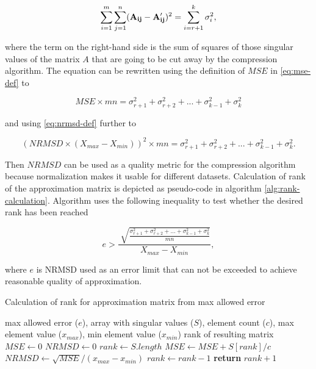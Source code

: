\begin{equation}
\sum_{i=1}^{m} \sum_{j=1}^{n} (\mathbf{A_{ij}} - \mathbf{A'_{ij}})^{2} = \sum_{i=r+1}^{k}{\sigma_{i}^{2}},
\end{equation}

where the term on the right-hand side is the sum of squares of those singular values of the matrix $A$ that are going to be cut away by the compression algorithm. The equation can be rewritten using the definition of $MSE$ in \eqref{eq:mse-def} to

\begin{equation}
MSE \times m n = \sigma_{r+1}^{2} + \sigma_{r+2}^{2} + ... + \sigma_{k-1}^{2} + \sigma_{k}^2
\end{equation}

and using \eqref{eq:nrmsd-def} further to

\begin{equation}
(NRMSD \times (X_{max}-X_{min}))^{2} \times m n = \sigma_{r+1}^{2} + \sigma_{r+2}^{2} + ... + \sigma_{k-1}^{2} + \sigma_{k}^2.
\end{equation}

Then $NRMSD$ can be used as a quality metric for the compression algorithm because normalization makes it usable for different datasets. Calculation of rank of the approximation matrix is depicted as pseudo-code in algorithm \ref{alg:rank-calculation}. Algorithm uses the following inequality to test whether the desired rank has been reached

\begin{equation}
e > \frac{\sqrt[]{\frac{\sigma_{r+1}^{2} + \sigma_{r+2}^{2} + ... + \sigma_{k-1}^{2} + \sigma_{k}^2}{m n}}}{X_{max}-X_{min}},
\end{equation}

where $e$ is NRMSD used as an error limit that can not be exceeded to achieve reasonable quality of approximation.

\begin{algorithm}
  \caption{Calculation of rank for approximation matrix from max allowed error}\label{rankAlgorithm}
  \label{alg:rank-calculation}
  \begin{algorithmic}[1]
  	\INPUT max allowed error ($e$), array with singular values ($S$), element count ($c$), max element value ($x_{max}$), min element value ($x_{min}$)
    \OUTPUT rank of resulting matrix
      \State $MSE \gets 0$
      \State $NRMSD \gets 0$
      \State $rank \gets S.length$
        \State $MSE \gets MSE + S[rank]/c$ 
        \State $NRMSD \gets \sqrt{MSE} / (x_{max} - x_{min})$ 
        \State $rank \gets rank - 1$ 
      \EndWhile
      \State \textbf{return} $rank + 1$ 
    \EndProcedure
  \end{algorithmic}
\end{algorithm}

